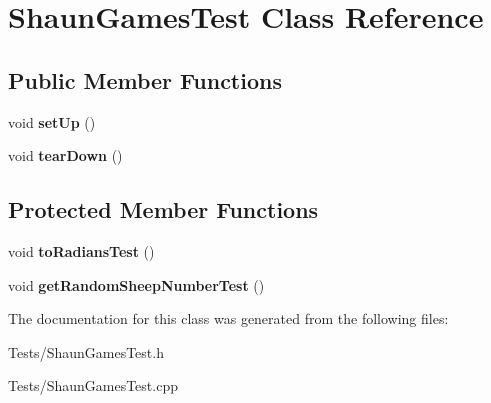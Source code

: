\hypertarget{classShaunGamesTest}{\section{\-Shaun\-Games\-Test \-Class \-Reference}
\label{classShaunGamesTest}
}
\subsection*{\-Public \-Member \-Functions}
\begin{DoxyCompactItemize}
\item 
\hypertarget{classShaunGamesTest_ac28823579a80e51eba218cc5c14ad83a}{void {\bfseries set\-Up} ()}\label{classShaunGamesTest_ac28823579a80e51eba218cc5c14ad83a}

\item 
\hypertarget{classShaunGamesTest_a4eac20bf37edcb06406385e6d34d5a30}{void {\bfseries tear\-Down} ()}\label{classShaunGamesTest_a4eac20bf37edcb06406385e6d34d5a30}

\end{DoxyCompactItemize}
\subsection*{\-Protected \-Member \-Functions}
\begin{DoxyCompactItemize}
\item 
\hypertarget{classShaunGamesTest_a942c9a600c86425c5a366138d7055956}{void {\bfseries to\-Radians\-Test} ()}\label{classShaunGamesTest_a942c9a600c86425c5a366138d7055956}

\item 
\hypertarget{classShaunGamesTest_a48473265c196e8dc38e0d0c9c66fd3c0}{void {\bfseries get\-Random\-Sheep\-Number\-Test} ()}\label{classShaunGamesTest_a48473265c196e8dc38e0d0c9c66fd3c0}

\end{DoxyCompactItemize}


\-The documentation for this class was generated from the following files\-:\begin{DoxyCompactItemize}
\item 
\-Tests/\-Shaun\-Games\-Test.\-h\item 
\-Tests/\-Shaun\-Games\-Test.\-cpp\end{DoxyCompactItemize}

